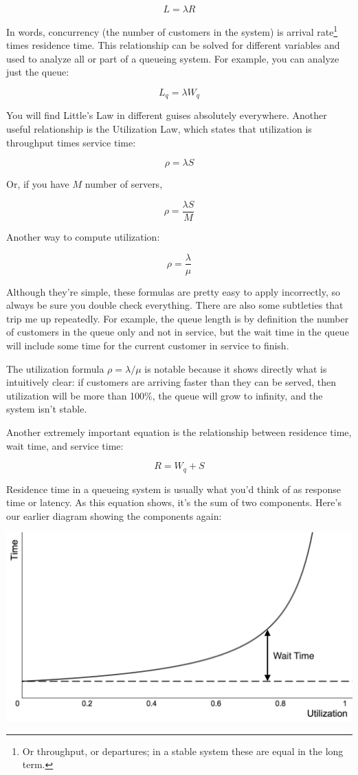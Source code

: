 \documentclass{vivid_layout_pdf}
\begin{document}
\[
   L = \lambda R
\]

In words, concurrency (the number of customers in the system) is arrival rate\footnote{Or throughput, or departures; in a stable system these are equal in the long term.} times residence time. This relationship can be solved for different variables and used to analyze all or part of a queueing system. For example, you can analyze just the queue:

\[
  L_q = \lambda  W_q
\]

You will find Little's Law in different guises absolutely everywhere. Another useful relationship is the Utilization Law, which states that utilization is throughput times service time:

\[
 \rho = \lambda  S
\]

Or, if you have $M$ number of servers,

\[
 \rho = \frac{ \lambda S }{M}
\]

Another way to compute utilization:

\[
 \rho = \frac{\lambda}{ \mu}
\]

Although they're simple, these formulas are pretty easy to apply incorrectly, so always be sure you double check everything. There are also some subtleties that trip me up repeatedly. For example, the queue length is by definition the number of customers in the queue only and not in service, but the wait time in the queue will include some time for the current customer in service to finish.

The utilization formula \(\rho = \lambda / \mu\) is notable because it shows directly what is intuitively clear: if customers are arriving faster than they can be served, then utilization will be more than 100\%, the queue will grow to infinity, and the system isn't stable.

Another extremely important equation is the relationship between residence time, wait time, and  service time:

\[
 R = W_q + S
\]

Residence time in a queueing system is usually what you'd think of as response time or latency. As this equation shows, it's the sum of two components.  Here's our earlier diagram showing the components again:

\begin{center}
\includegraphics[width=.75\linewidth]{queueing-theory/hockey-stick-1}
\end{center}
\end{document}
